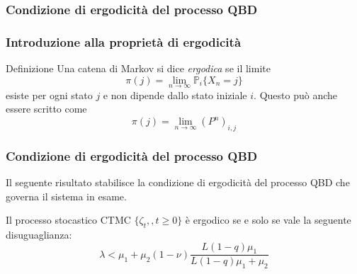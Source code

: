 \documentclass{beamer}
\begin{document}

\subsubsection{Condizione di ergodicità del processo QBD}

\begin{frame}
    \frametitle{Introduzione alla proprietà di ergodicità}
    \begin{block}{Definizione}
        Una catena di Markov si dice \emph{ergodica} se il limite
        $$ \pi(j) = \lim_{n\to \infty} \mathbb{P}_i \{X_n = j\} $$
        esiste per ogni stato $j$ e non dipende dallo stato iniziale $i$. Questo può anche essere scritto come
        $$ \pi(j) = \lim_{n \to \infty} (P^n)_{i,j} $$
    \end{block}

\end{frame}

\begin{frame}
    \frametitle{Condizione di ergodicità del processo QBD}
    Il seguente risultato stabilisce la condizione di ergodicità del processo QBD che governa il sistema in esame.
    \begin{theorem}
        Il processo stocastico CTMC $\{\zeta_t,,t\geq 0\}$ è ergodico se e solo se vale la seguente disuguaglianza:
        \begin{equation*}\label{eq:ergodicity}
            \lambda < \mu_1 + \mu_2(1 - \nu) \frac{L(1-q)\mu_1}{L(1-q)\mu_1 + \mu_2}
        \end{equation*}
    \end{theorem}
\end{frame}
\end{document}

